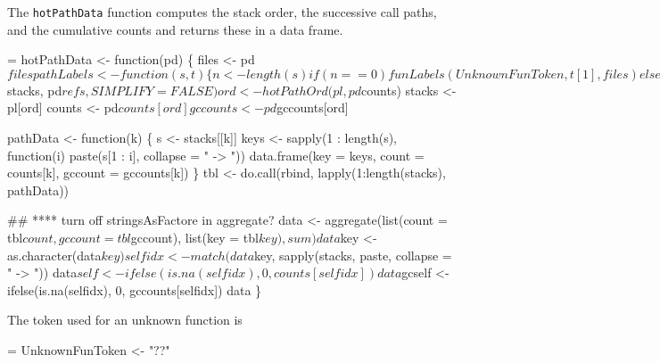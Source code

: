 \documentclass[11pt]{article}
\begin{document}
The \Verb!hotPathData! function computes the stack order, the successive
call paths, and the cumulative counts and returns these in a data
frame.
\begin{nwchunk}
=
 hotPathData <- function(pd) \{
     files <- pd$files
     pathLabels <- function(s, t) \{
         n <- length(s)
         if (n == 0)
             funLabels(UnknownFunToken, t[1], files)
         else if (is.na(t[n + 1]))
             funLabels(s, t[1:n], files)
         else
             funLabels(c(s, UnknownFunToken), t, files)
     \}
 
     pl <- mapply(pathLabels, pd$stacks, pd$refs, SIMPLIFY = FALSE)
     ord <- hotPathOrd(pl, pd$counts)
     stacks <- pl[ord]
     counts <- pd$counts[ord]
     gccounts <- pd$gccounts[ord]
 
     pathData <- function(k) \{
         s <- stacks[[k]]
         keys <- sapply(1 : length(s),
                        function(i) paste(s[1 : i], collapse = " -> "))
         data.frame(key = keys,
                    count = counts[k],
                    gccount = gccounts[k])
     \}
     tbl <- do.call(rbind, lapply(1:length(stacks), pathData))
 
     ## **** turn off stringsAsFactore in aggregate?
     data <- aggregate(list(count = tbl$count, gccount = tbl$gccount),
                       list(key = tbl$key),
                       sum)
     data$key <- as.character(data$key)
 
     selfidx <- match(data$key, sapply(stacks, paste, collapse = " -> "))
     data$self <- ifelse(is.na(selfidx), 0, counts[selfidx])
     data$gcself <- ifelse(is.na(selfidx), 0, gccounts[selfidx])
     data
 \}
\end{nwchunk}
The token used for an unknown function is
\begin{nwchunk}
=
 UnknownFunToken <- "??"
\end{nwchunk}
\end{document}
